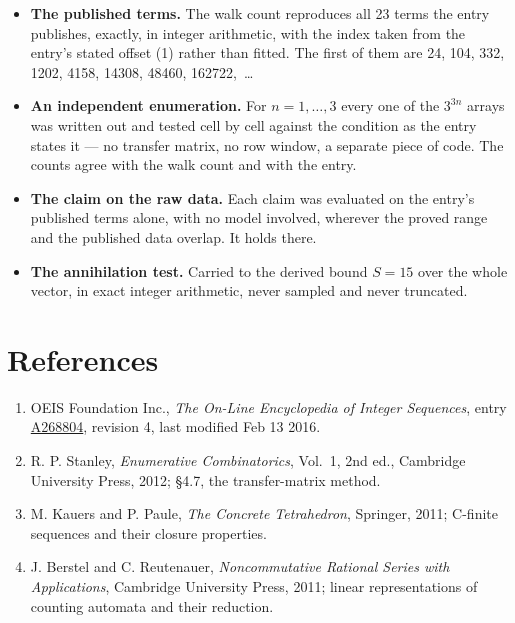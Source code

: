 \documentclass[11pt]{article}
\theoremstyle{definition}
\begin{document}
\begin{itemize}

\item {\bfseries The published terms.} The walk count reproduces all 23 terms the entry publishes, exactly, in integer arithmetic, with the index taken from the entry's stated offset (1) rather than fitted. The first of them are 24, 104, 332, 1202, 4158, 14308, 48460, 162722,~\dots

\item {\bfseries An independent enumeration.} For $n = 1,\dots,3$ every one of the $3^{3n}$ arrays was written out and tested cell by cell against the condition as the entry states it --- no transfer matrix, no row window, a separate piece of code. The counts agree with the walk count and with the entry.

\item {\bfseries The claim on the raw data.} Each claim was evaluated on the entry's published terms alone, with no model involved, wherever the proved range and the published data overlap. It holds there.

\item {\bfseries The annihilation test.} Carried to the derived bound $S = 15$ over the whole vector, in exact integer arithmetic, never sampled and never truncated.

\end{itemize}

\section{References}

\begin{enumerate}

\item OEIS Foundation Inc., \emph{The On-Line Encyclopedia of Integer Sequences}, entry \href{https://oeis.org/A268804}{A268804}, revision 4, last modified Feb 13 2016.

\item R. P. Stanley, \emph{Enumerative Combinatorics}, Vol.~1, 2nd ed., Cambridge University Press, 2012; \S4.7, the transfer-matrix method.

\item M. Kauers and P. Paule, \emph{The Concrete Tetrahedron}, Springer, 2011; C-finite sequences and their closure properties.

\item J. Berstel and C. Reutenauer, \emph{Noncommutative Rational Series with Applications}, Cambridge University Press, 2011; linear representations of counting automata and their reduction.

\end{enumerate}
\end{document}
